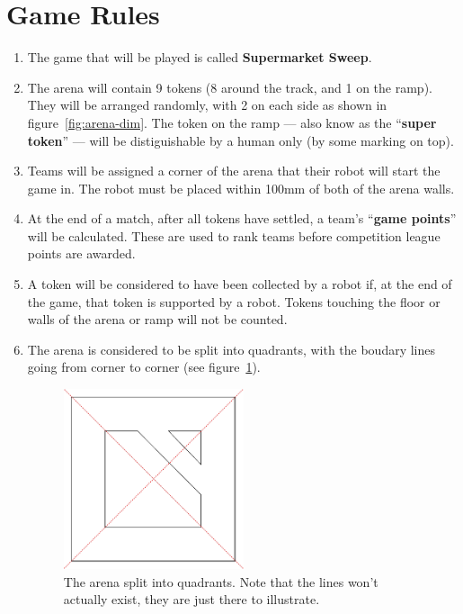 \section {Game Rules}
\label{game-rules}

\begin{enumerate}
\item The game that will be played is called \textbf{Supermarket Sweep}.
\item The arena will contain 9 tokens (8 around the track, and 1 on the ramp).  They will be arranged randomly, with 2 on each side as shown in figure~\ref{fig:arena-dim}.  The token on the ramp --- also know as the ``\textbf{super token}'' --- will be distiguishable by a human only (by some marking on top).
\item Teams will be assigned a corner of the arena that their robot will start the game in.  The robot must be placed within 100mm of both of the arena walls.
\item At the end of a match, after all tokens have settled, a team's ``\textbf{game points}'' will be calculated.
 These are used to rank teams before competition league points are awarded.
\item A token will be considered to have been collected by a robot if, at the end of the game, that token is supported by a robot.  Tokens touching the floor or walls of the arena or ramp will not be counted.

\item The arena is considered to be split into quadrants, with the boudary lines going from corner to corner (see figure~\ref{fig:quadrants}).

\begin{figure}
\begin{center}
  \includegraphics[keepaspectratio, clip, width=0.5\textwidth]{./images/quadrants.pdf}
  \caption{\label{fig:quadrants}The arena split into quadrants. Note that the lines won't actually exist, they are just there to illustrate.}
\end{center}
\end{figure}


\end{enumerate}
